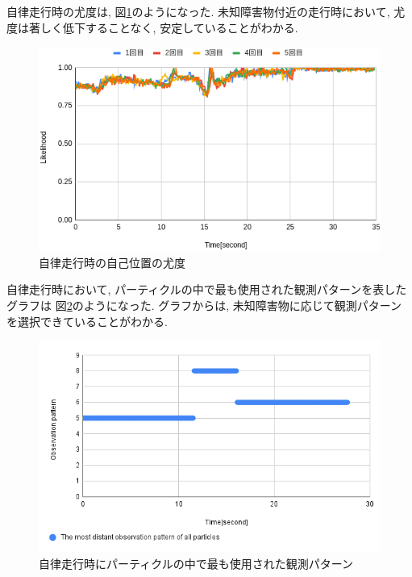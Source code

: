 自律走行時の尤度は, 図\ref{fig:nav_likelihood_imp}のようになった. 
未知障害物付近の走行時において, 尤度は著しく低下することなく, 安定していることがわかる. 

\begin{figure}[H]
  \begin{center}
    \includegraphics[width=0.98\linewidth]{figs/sim_likelihood_after.png}
    \caption{自律走行時の自己位置の尤度}
    \label{fig:nav_likelihood_imp}
  \end{center}
\end{figure}

自律走行時において, パーティクルの中で最も使用された観測パターンを表したグラフは
図\ref{fig:obs_pattern_sim}のようになった. 
グラフからは, 未知障害物に応じて観測パターンを選択できていることがわかる. 

\begin{figure}[h]
  \begin{center}
    \includegraphics[width=0.98\linewidth]{figs/sim_imp_ob_pattern.png}
    \caption{自律走行時にパーティクルの中で最も使用された観測パターン}
    \label{fig:obs_pattern_sim}
  \end{center}
\end{figure}

